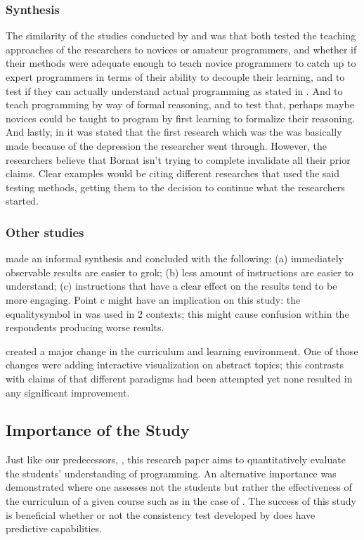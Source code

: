 \documentclass[12pt]{article}
\begin{document}
\subsubsection{Synthesis}
\label{sec:orgd589b95}
The similarity of the studies conducted by \cite{dehnadi2006camel} and
\cite{bornat2008mental} was that both tested the teaching approaches of
the researchers to novices or amateur programmers, and whether if
their methods were adequate enough to teach novice programmers to
catch up to expert programmers in terms of their ability to \gls{decouple}
their learning, and to test if they can actually understand actual
programming as stated in \cite{dehnadi2006camel}. And to teach
programming by way of formal reasoning, and to test that, perhaps
maybe novices could be taught to program by first learning to
formalize their reasoning. And lastly, in \cite{bornat2014camels} it was
stated that the first research which was the \cite{dehnadi2006camel} was
basically made because of the depression the researcher went
through. However, the researchers believe that Bornat isn’t trying to
complete invalidate all their prior claims. Clear examples would be
citing different researches that used the said testing methods,
getting them to the decision to continue what the researchers started.

\subsubsection{Other studies}
\label{sec:org8fd5370}
\cite{bricklin2002} made an informal synthesis and concluded with the following: 
(a) immediately observable results are easier to grok; 
(b) less amount of instructions are easier to understand; 
(c) instructions that have a clear effect on the results tend to be more engaging.
Point c might have an implication on this study: 
the \gls{equalitysymbol} in \cite{dehnadi2006camel} was used in 2 contexts;
this might cause confusion within the respondents producing worse results.

\cite{chalk2003improving} created a major change in the curriculum and learning environment.
One of those changes were adding interactive visualization on abstract topics;
this contrasts with claims of \cite{dehnadi2006camel} that different paradigms had been attempted yet 
none resulted in any significant improvement.

\subsection{Importance of the Study}
\label{sec:orgbce010f}
Just like our predecessors, \cite{dehnadi2006camel}, 
this research paper aims to quantitatively evaluate the students' understanding of programming. 
An alternative importance was demonstrated where 
one assesses not the students but rather the effectiveness of the curriculum of a given course
such as in the case of \cite{ford2010assessing}.
The success of this study is beneficial whether or not 
the consistency test developed by \citeauthor{dehnadi2006camel} does have predictive capabilities.
\end{document}
